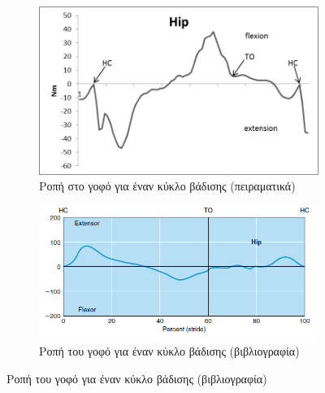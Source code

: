 \begin{figure}[H]
    \centering
    \begin{subfigure}[t]{.48\textwidth}
        \includegraphics[width=\textwidth, keepaspectratio]{fig/id-hip.png}
        \caption{Ροπή στο γοφό για έναν κύκλο βάδισης (πειραματικά)}
        \label{fig:hip-moment}
    \end{subfigure}
    \begin{subfigure}[t]{.48\textwidth}
        \includegraphics[width=\textwidth, keepaspectratio]{fig/id-hip-ref.png}
        \caption{Ροπή του γοφό για έναν κύκλο βάδισης (βιβλιογραφία)}
        \label{fig:hip-moment-ref}
    \end{subfigure}


\end{figure}
